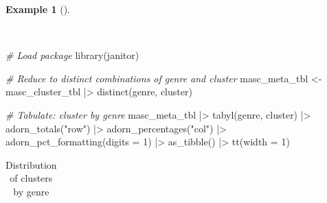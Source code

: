 \documentclass[
  letterpaper,
  krantz1]{latex/krantz-mod}
\newenvironment{Shaded}{\begin{snugshade}}{\end{snugshade}}
\newcommand{\AttributeTok}[1]{\textcolor[rgb]{0.00,0.00,0.00}{#1}}
\newcommand{\CommentTok}[1]{\textcolor[rgb]{0.00,0.00,0.00}{\textit{#1}}}
\newcommand{\DecValTok}[1]{\textcolor[rgb]{0.00,0.00,0.00}{#1}}
\newcommand{\FunctionTok}[1]{\textcolor[rgb]{0.00,0.00,0.00}{#1}}
\newcommand{\NormalTok}[1]{\textcolor[rgb]{0.00,0.00,0.00}{#1}}
\newcommand{\OtherTok}[1]{\textcolor[rgb]{0.00,0.00,0.00}{#1}}
\newcommand{\SpecialCharTok}[1]{\textcolor[rgb]{0.00,0.00,0.00}{#1}}
\newcommand{\StringTok}[1]{\textcolor[rgb]{0.00,0.00,0.00}{#1}}
\theoremstyle{definition}
\newtheorem{example}{Example}[chapter]
\theoremstyle{definition}
\theoremstyle{remark}
\begin{document}
\begin{example}[]\protect\hypertarget{exm-explore-masc-pos-kmeans-genre}{}\label{exm-explore-masc-pos-kmeans-genre}

~

\begin{Shaded}
\begin{Highlighting}[numbers=left,,]
\CommentTok{\# Load package}
\FunctionTok{library}\NormalTok{(janitor)}

\CommentTok{\# Reduce to distinct combinations of genre and cluster}
\NormalTok{masc\_meta\_tbl }\OtherTok{\textless{}{-}}
\NormalTok{  masc\_cluster\_tbl }\SpecialCharTok{|\textgreater{}}
  \FunctionTok{distinct}\NormalTok{(genre, cluster)}

\CommentTok{\# Tabulate: cluster by genre}
\NormalTok{masc\_meta\_tbl }\SpecialCharTok{|\textgreater{}}
  \FunctionTok{tabyl}\NormalTok{(genre, cluster) }\SpecialCharTok{|\textgreater{}}
  \FunctionTok{adorn\_totals}\NormalTok{(}\StringTok{"row"}\NormalTok{) }\SpecialCharTok{|\textgreater{}}
  \FunctionTok{adorn\_percentages}\NormalTok{(}\StringTok{"col"}\NormalTok{) }\SpecialCharTok{|\textgreater{}}
  \FunctionTok{adorn\_pct\_formatting}\NormalTok{(}\AttributeTok{digits =} \DecValTok{1}\NormalTok{) }\SpecialCharTok{|\textgreater{}}
  \FunctionTok{as\_tibble}\NormalTok{() }\SpecialCharTok{|\textgreater{}}
  \FunctionTok{tt}\NormalTok{(}\AttributeTok{width =} \DecValTok{1}\NormalTok{)}
\end{Highlighting}
\end{Shaded}

\begin{longtable}[]{@{}
  >{\raggedright\arraybackslash}p{}
  >{\raggedright\arraybackslash}p{}
  >{\raggedright\arraybackslash}p{}
  >{\raggedright\arraybackslash}p{}
  >{\raggedright\arraybackslash}p{}@{}}

\caption{\label{tbl-explore-masc-pos-kmeans-genre}Distribution of
clusters by genre}

\tabularnewline


\end{longtable}
\end{example}
\end{document}
